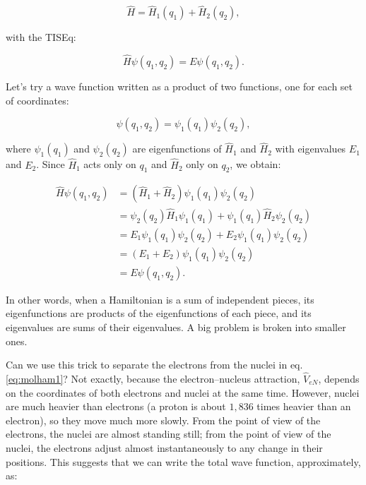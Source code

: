 \documentclass[
  english,
  9pt,
]{extbook}
\theoremstyle{definition}
\theoremstyle{definition}
\theoremstyle{definition}
\theoremstyle{definition}
\theoremstyle{remark}
\begin{document}
\begin{equation}
\hat{H} = \hat{H}_1(q_1) + \hat{H}_2(q_2),
\label{eq:molham3}
\end{equation}

with the TISEq:

\begin{equation}
\hat{H} \psi(q_1, q_2) = E \psi(q_1, q_2).
\label{eq:molham4}
\end{equation}

Let's try a wave function written as a product of two functions, one for each set of coordinates:

\begin{equation}
\psi(q_1, q_2) = \psi_1(q_1) \psi_2(q_2),
\label{eq:molham5}
\end{equation}

where \(\psi_1(q_1)\) and \(\psi_2(q_2)\) are eigenfunctions of \(\hat{H}_1\) and \(\hat{H}_2\) with eigenvalues \(E_1\) and \(E_2\). Since \(\hat{H}_1\) acts only on \(q_1\) and \(\hat{H}_2\) only on \(q_2\), we obtain:

\begin{equation}
\begin{aligned}
\displaystyle \hat{H} \psi(q_1, q_2) &= ( \hat{H}_1 + \hat{H}_2 ) \psi_1(q_1) \psi_2(q_2) \\
    &= \psi_2(q_2)\hat{H}_1 \psi_1(q_1) + \psi_1(q_1)\hat{H}_2 \psi_2(q_2) \\
    &= E_1 \psi_1(q_1) \psi_2(q_2) + E_2 \psi_1(q_1) \psi_2(q_2) \\
    &= (E_1 + E_2) \psi_1(q_1) \psi_2(q_2) \\
    &= E \psi(q_1, q_2).
\end{aligned}
\label{eq:molham6}
\end{equation}

In other words, when a Hamiltonian is a sum of independent pieces, its eigenfunctions are products of the eigenfunctions of each piece, and its eigenvalues are sums of their eigenvalues. A big problem is broken into smaller ones.

Can we use this trick to separate the electrons from the nuclei in eq. \eqref{eq:molham1}? Not exactly, because the electron--nucleus attraction, \(\hat{V}_{eN}\), depends on the coordinates of both electrons and nuclei at the same time. However, nuclei are much heavier than electrons (a proton is about \(1{,}836\) times heavier than an electron), so they move much more slowly. From the point of view of the electrons, the nuclei are almost standing still; from the point of view of the nuclei, the electrons adjust almost instantaneously to any change in their positions. This suggests that we can write the total wave function, approximately, as:
\end{document}

